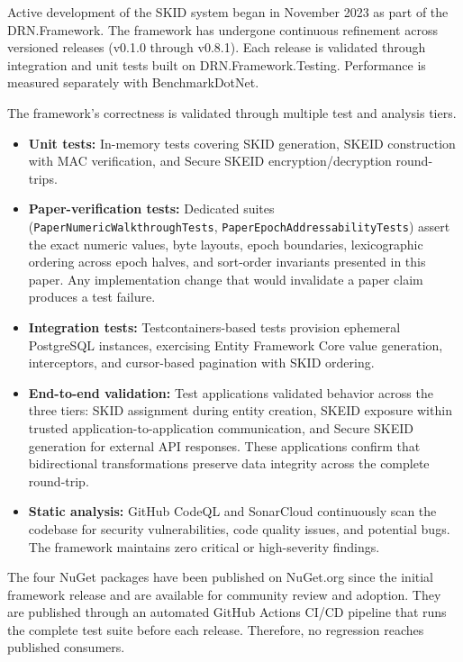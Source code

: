 \documentclass[fleqn,10pt,lineno]{wlpeerj}
\providecommand{\tightlist}{%
  \setlength{\itemsep}{0pt}\setlength{\parskip}{0pt}}
\begin{document}
Active development of the SKID system began in November 2023 as part of
the DRN.Framework. The framework has undergone continuous refinement
across versioned releases (v0.1.0 through v0.8.1). Each release is
validated through integration and unit tests built on
DRN.Framework.Testing. Performance is measured separately with
BenchmarkDotNet.

The framework's correctness is validated through multiple test and
analysis tiers.

\begin{itemize}
\tightlist
\item
  \textbf{Unit tests:} In-memory tests covering SKID generation, SKEID
  construction with MAC verification, and Secure SKEID
  encryption/decryption round-trips.
\item
  \textbf{Paper-verification tests:} Dedicated suites
  (\texttt{PaperNumericWalkthroughTests},
  \texttt{PaperEpochAddressabilityTests}) assert the exact numeric
  values, byte layouts, epoch boundaries, lexicographic ordering across
  epoch halves, and sort-order invariants presented in this paper. Any
  implementation change that would invalidate a paper claim produces a
  test failure.
\item
  \textbf{Integration tests:} Testcontainers-based tests provision
  ephemeral PostgreSQL instances, exercising Entity Framework Core value
  generation, interceptors, and cursor-based pagination with SKID
  ordering.
\item
  \textbf{End-to-end validation:} Test applications validated behavior
  across the three tiers: SKID assignment during entity creation, SKEID
  exposure within trusted application-to-application communication, and
  Secure SKEID generation for external API responses. These applications
  confirm that bidirectional transformations preserve data integrity
  across the complete round-trip.
\item
  \textbf{Static analysis:} GitHub CodeQL and SonarCloud continuously
  scan the codebase for security vulnerabilities, code quality issues,
  and potential bugs. The framework maintains zero critical or
  high-severity findings.
\end{itemize}

The four NuGet packages have been published on NuGet.org since the
initial framework release and are available for community review and
adoption. They are published through an automated GitHub Actions CI/CD
pipeline that runs the complete test suite before each release.
Therefore, no regression reaches published consumers.
\end{document}
